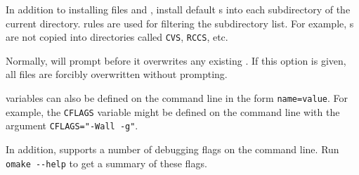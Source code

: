 \begin{Description}
\item[\Opt{--install-all}] In addition to installing files  and ,
  install default s into each subdirectory of the current directory.
   rules are used for filtering the subdirectory list.  For example, s
  are not copied into directories called \verb+CVS+, \verb+RCCS+, etc.

\item[\Opt{--install-force}] Normally,  will prompt before it overwrites any
  existing .  If this option is given, all files are forcibly overwritten
  without prompting.

\item[\Opt{var-definition}]  variables can also be defined on the command
  line in the form \verb+name=value+.  For example, the \verb+CFLAGS+ variable might be defined
  on the command line with the argument \verb+CFLAGS="-Wall -g"+.
\end{Description}

In addition,  supports a number of debugging flags on the command line. Run
\verb+omake --help+ to get a summary of these flags.

